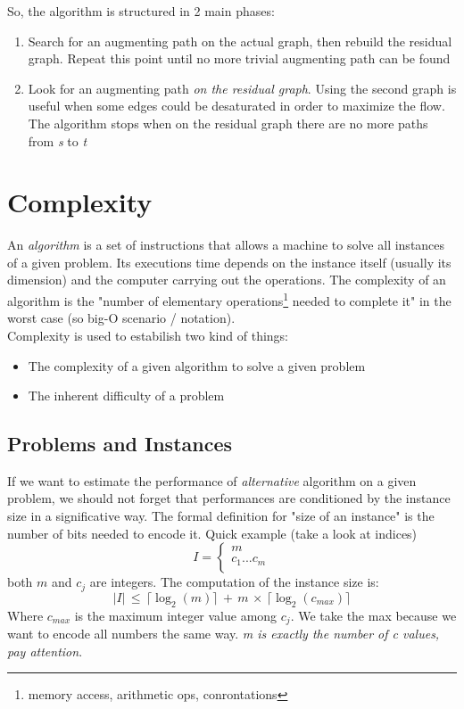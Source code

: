 \documentclass{article}
\begin{document}
					So, the algorithm is structured in 2 main phases:
					\begin{enumerate}
						\item Search for an augmenting path on the actual graph, then rebuild the residual graph. Repeat this point until no more trivial augmenting path can be found
						\item Look for an augmenting path \textit{on the residual graph}. Using the second graph is useful when some edges could be desaturated in order to maximize the flow. The algorithm stops when on the residual graph there are no more paths from \emph{s} to \emph{t}
					\end{enumerate}



	\clearpage
	\section{Complexity}
		An \textit{algorithm} is a set of instructions that allows a machine to solve all instances of a given problem. Its executions time depends on the instance itself (usually its dimension) and the computer carrying out the operations. The complexity of an algorithm is the "number  of elementary operations\footnote{memory access, arithmetic ops, conrontations} needed to complete it" in the worst case (so big-O scenario / notation).\\
		Complexity is used to estabilish two kind of things:
		\begin{itemize}
			\item The complexity of a given algorithm to solve a given problem
			\item The inherent difficulty of a problem
		\end{itemize}

		\subsection{Problems and Instances}
			If we want to estimate the performance of \textit{alternative} algorithm on a given problem, we should not forget that performances are conditioned by the instance size in a significative way. The formal definition for "size of an instance" is the number of bits needed to encode it. Quick example (take a look at indices)
			\begin{equation}
				I = \begin{cases}
					m\\
					c_1 ... c_m\\
				\end{cases}
			\end{equation}
			both $m$ and $c_j$ are integers. The computation of the instance size is:
			\begin{equation}
				\vert I \vert \,\leq\, \lceil \log_2(m) \rceil \,+\, m \,\times\, \lceil \log_2(c_{max}) \rceil
			\end{equation}
			Where $c_{max}$ is the maximum integer value among $c_j$. We take the max because we want to encode all numbers the same way. \textit{m is exactly the number of c values, pay attention}.
\end{document}
